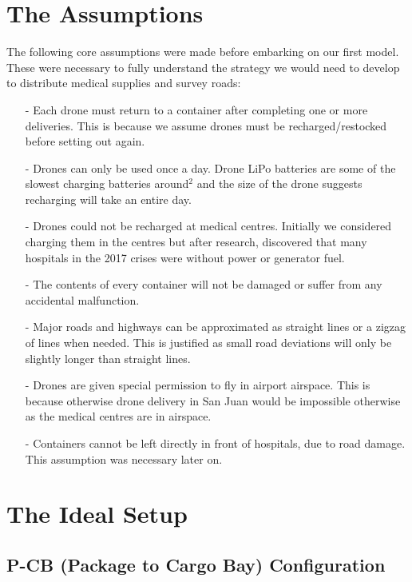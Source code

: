 \documentclass[a4paper,12pt]{article}
\begin{document}
\section{The Assumptions}
The following core assumptions were made before embarking on our first model. These were necessary to fully understand the strategy we would
need to develop to distribute medical supplies and survey roads:

\begin{itemize}
\item[-]Each drone must return to a container after completing one or more deliveries.
        This is because we assume drones must be recharged/restocked before setting out again.
\item[-]Drones can only be used once a day. Drone LiPo batteries are some of the slowest charging batteries around$^{2}$ and
        the size of the drone suggests recharging will take an entire day.
\item[-]Drones could not be recharged at medical centres.
        Initially we considered charging them in the centres but after research, discovered that
        many hospitals in the 2017 crises were without power or generator fuel.
\item[-]The contents of every container will not be damaged or suffer from any accidental malfunction.
\item[-]Major roads and highways can be approximated as straight lines or a zigzag of lines when needed. This is justified as small road deviations will only be slightly longer than straight lines.
\item[-]Drones are given special permission to fly in airport airspace. This is because otherwise drone delivery in San Juan would be impossible otherwise as the medical centres are in airspace.
\item[-]Containers cannot be left directly in front of hospitals, due to road damage. This assumption was necessary later on.

\end{itemize}

\section{The Ideal Setup}

\subsection{P-CB (Package to Cargo Bay) Configuration}
\end{document}
